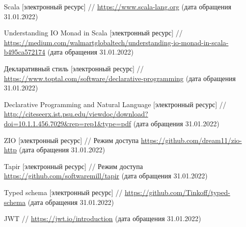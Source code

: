 \documentclass[14pt]{extarticle}
\begin{document}
    \begin{thebibliography}{99}
        Scala [электронный ресурс] // \url{https://www.scala-lang.org} (дата обращения 31.01.2022)

        Understanding IO Monad in Scala [электронный ресурс] //
        \url{https://medium.com/walmartglobaltech/understanding-io-monad-in-scala-b495ca572174}
        (дата обращения 31.01.2022)

        Декларативный стиль [электронный ресурс] // \url{https://www.toptal.com/software/declarative-programming}
        (дата обращения 31.01.2022)

        Declarative Programming and Natural Language [электронный ресурс] // \url{http://citeseerx.ist.psu.edu/viewdoc/download?doi=10.1.1.456.7029&rep=rep1&type=pdf}
        (дата обращения 31.01.2022)

        ZIO [электронный ресурс] // Режим доступа \url{https://github.com/dream11/zio-http} (дата обращения 31.01.2022)

        Tapir [электронный ресурс] // Режим доступа \url{https://github.com/softwaremill/tapir} (дата обращения 31.01.2022)

        Typed schema [электронный ресурс] // \url{https://github.com/Tinkoff/typed-schema} (дата обращения 31.01.2022)

        JWT //
        \url{https://jwt.io/introduction}
        (дата обращения 31.01.2022)

    \end{thebibliography}
\end{document}
